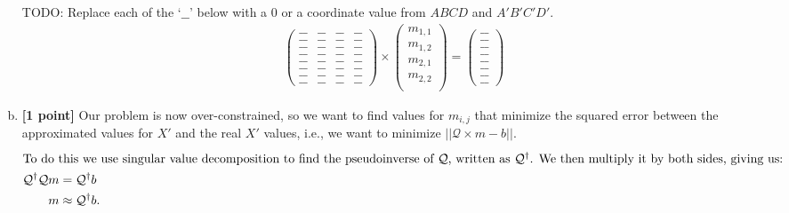 \begin{enumerate}[(a)]
\begin{mdframed}
TODO: Replace each of the `$\_\_$' below with a $0$ or a coordinate value from $ABCD$ and $A'B'C'D'$.
\begin{align*}
    \begin{pmatrix} 
    \_\_ & \_\_ & \_\_ & \_\_ \\ 
    \_\_ & \_\_ & \_\_ & \_\_ \\ 
    \_\_ & \_\_ & \_\_ & \_\_ \\ 
    \_\_ & \_\_ & \_\_ & \_\_ \\ 
    \_\_ & \_\_ & \_\_ & \_\_ \\ 
    \_\_ & \_\_ & \_\_ & \_\_ \\ 
    \_\_ & \_\_ & \_\_ & \_\_ \\ 
    \_\_ & \_\_ & \_\_ & \_\_
    \end{pmatrix} 
    \times \begin{pmatrix} m_{1,1} \\ m_{1,2} \\ m_{2,1} \\ m_{2,2} \\ \end{pmatrix} 
    = \begin{pmatrix} 
    \_\_ \\ 
    \_\_ \\ 
    \_\_ \\ 
    \_\_ \\ 
    \_\_ \\ 
    \_\_ \\ 
    \_\_ \\ 
    \_\_ 
    \end{pmatrix}
\end{align*}
\end{mdframed}

\item \textbf{[1 point]} Our problem is now over-constrained, so we want to find values for $m_{i,j}$ that minimize the squared error between the approximated values for $X'$ and the real $X'$ values, i.e., we want to minimize $||\mathcal{Q} \times m - b||$. 
\begin{align*}
\intertext{To do this we use singular value decomposition to find the pseudoinverse of $\mathcal{Q}$, written as $\mathcal{Q}^\dagger$. We then multiply it by both sides, giving us:}
 \mathcal{Q}^\dagger \mathcal{Q}m &= \mathcal{Q}^\dagger b\\
 \quad m &\approx \mathcal{Q}^\dagger b.
\end{align*}


\end{enumerate}
